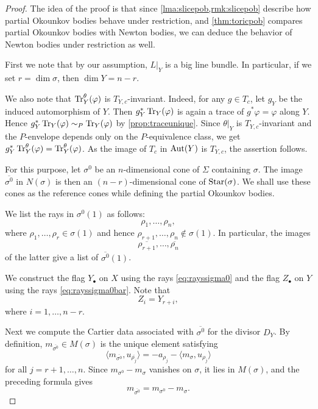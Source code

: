 \begin{proof}
    The idea of the proof is that since \cref{lma:slicepob,rmk:slicepob} describe how partial Okounkov bodies behave under restriction, and \cref{thm:toricpob} compares partial Okounkov bodies with Newton bodies, we can deduce the behavior of Newton bodies under restriction as well.

    First we note that by our assumption, $L|_Y$ is a big line bundle. In particular, if we set $r=\dim \sigma$, then $\dim Y=n-r$.

    We also note that $\operatorname{Tr}_Y^\theta(\varphi)$ is $T_{Y,c}$-invariant. Indeed, for any $g\in T_c$, let $g_Y$ be the induced automorphism of $Y$. Then $g_Y^*\operatorname{Tr}_Y(\varphi)$ is again a trace of $g^*\varphi=\varphi$ along $Y$. Hence $g_Y^*\operatorname{Tr}_Y(\varphi)\sim_P\operatorname{Tr}_Y(\varphi)$ by \cref{prop:traceunique}. Since $\theta|_Y$ is $T_{Y,c}$-invariant and the $P$-envelope depends only on the $P$-equivalence class, we get $g_Y^*\operatorname{Tr}_Y^\theta(\varphi)=\operatorname{Tr}_Y^\theta(\varphi)$. As the image of $T_c$ in $\operatorname{Aut}(Y)$ is $T_{Y,c}$, the assertion follows.

    For this purpose, let $\sigma^0$ be an $n$-dimensional cone of $\Sigma$ containing $\sigma$. The image $\overline{\sigma^0}$ in $N(\sigma)$ is then an $(n-r)$-dimensional cone of $\mathrm{Star}(\sigma)$. We shall use these cones as the reference cones while defining the partial Okounkov bodies.

    We list the rays in $\sigma^0(1)$ as follows:
    \begin{equation}\label{eq:rayssigma0}
        \rho_1,\ldots,\rho_n,
    \end{equation}
    where $\rho_1,\ldots,\rho_r\in \sigma(1)$
    and hence $\rho_{r+1},\ldots,\rho_n\not\in \sigma(1)$. In particular, the images
    \begin{equation}\label{eq:rayssigma0bar}
        \overline{\rho_{r+1}},\ldots,\overline{\rho_{n}}
    \end{equation}
    of the latter give a list of $\overline{\sigma^0}(1)$.

    We construct the flag $Y_{\bullet}$ on $X$ using the rays \eqref{eq:rayssigma0} and the flag $Z_{\bullet}$ on $Y$ using the rays \eqref{eq:rayssigma0bar}. Note that
    \[
        Z_i=Y_{r+i},
    \]
    where $i=1,\ldots,n-r$.

    Next we compute the Cartier data associated with $\overline{\sigma^0}$ for the divisor $D_Y$. By definition, $m_{\overline{\sigma^0}}\in M(\sigma)$ is the unique element satisfying
    \[
        \langle m_{\overline{\sigma^0}},u_{\overline{\rho_j}}\rangle=-a_{\rho_j}-\langle m_{\sigma},u_{\rho_j}\rangle
    \]
    for all $j=r+1,\ldots,n$.
    Since $m_{\sigma^0}-m_{\sigma}$ vanishes on $\sigma$, it lies in $M(\sigma)$, and the preceding formula gives
    \[
        m_{\overline{\sigma^0}}=m_{\sigma^0}-m_{\sigma}.
    \]


\end{proof}
